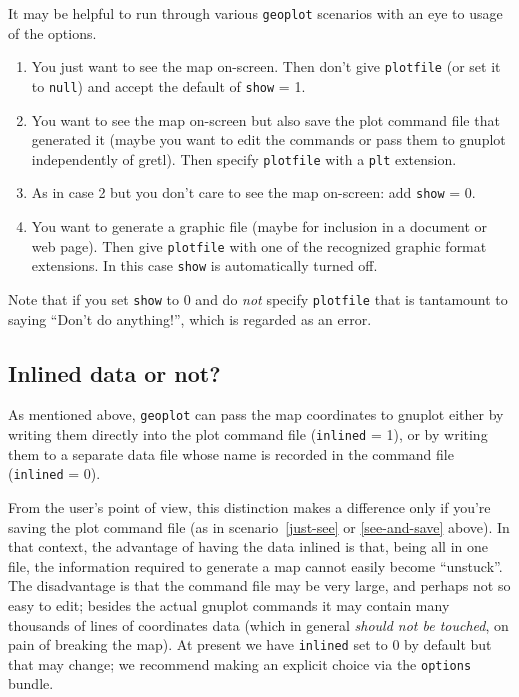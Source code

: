 \documentclass{article}
\begin{document}
It may be helpful to run through various \texttt{geoplot} scenarios
with an eye to usage of the options.

\begin{enumerate}
\item You just want to see the map on-screen. Then don't give
  \texttt{plotfile} (or set it to \texttt{null}) and accept the
  default of \texttt{show} = 1.\label{just-see}
\item You want to see the map on-screen but also save the plot command
  file that generated it (maybe you want to edit the commands or pass
  them to \textsf{gnuplot} independently of gretl). Then specify
  \texttt{plotfile} with a \texttt{plt} extension.\label{see-and-save}
\item As in case 2 but you don't care to see the map on-screen: add
  \texttt{show} = 0.
\item You want to generate a graphic file (maybe for inclusion in a
  document or web page). Then give \texttt{plotfile} with one of the
  recognized graphic format extensions. In this case \texttt{show} is
  automatically turned off.
\end{enumerate}

Note that if you set \texttt{show} to 0 and do \textit{not} specify
\texttt{plotfile} that is tantamount to saying ``Don't do anything!'',
which is regarded as an error.

\subsection{Inlined data or not?}

As mentioned above, \texttt{geoplot} can pass the map coordinates to
\textsf{gnuplot} either by writing them directly into the plot command
file (\texttt{inlined} = 1), or by writing them to a separate data
file whose name is recorded in the command file (\texttt{inlined} =
0).

From the user's point of view, this distinction makes a difference
only if you're saving the plot command file (as in
scenario~\ref{just-see} or \ref{see-and-save} above).  In that
context, the advantage of having the data inlined is that, being all
in one file, the information required to generate a map cannot easily
become ``unstuck''. The disadvantage is that the command file may be
very large, and perhaps not so easy to edit; besides the actual
\textsf{gnuplot} commands it may contain many thousands of lines of
coordinates data (which in general \textit{should not be touched}, on
pain of breaking the map). At present we have \texttt{inlined} set to
0 by default but that may change; we recommend making an explicit
choice via the \texttt{options} bundle.
\end{document}
